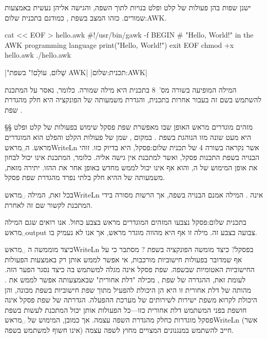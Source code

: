 ישנן שפות בהן פעולות של קלט ופלט בנויות לתוך השפה, והגישה אליהן נעשית באמצעות
 שמורים. כזהו המצב בשפת \AWK, כמודגם ב תכנית שלום:AWK.

\bash
cat << EOF > hello.awk
#!/usr/bin/gawk -f
BEGIN { # "Hello, World!" in the AWK programming language
  print("Hello, World!")
  exit
}
EOF
chmod +x hello.awk
./hello.awk
\END
\begin{תכנית}
\setLTR

\setRTL
{}|"שָׁלוֹם, עוֹלָם!" בשפת AWK|
|תכנית:שלום:AWK|
\end{תכנית}
המילה  המופיעה בשורה מס'~8 בתכנית היא מילה שמורה. כלומר, נאסר על
המתכנת להשתמש בשם זה בעבור  אחרות בתכנית, והגדרת משמעותה של הפונקציה
 היא חלק מהגדרת שפת .

§§ מזהים מוגדרים מראש
האופן שבו מאפשרת שפת פסקל שימוש בפעולות של קלט ופלט היא מעט שונה מזו הנוהגת
בשפת . במקום , שמן של פעולות הקלט והפלט
הוא  המוגדרים מראש. ה ␣מראש{WriteLn} אשר נקראה בשורה 4 של
 תכנית שלום:פסקל, היא בדיוק כזו. זוהי  הבנויה בשפת התכנות פסקל, ואשר
למתכנת אין גישה אליה. כלומר, המתכנת אינו יכול לבחון את אופן המימוש של ה,
והוא אף אינו יכול לממש מחדש באופן אחר את ה הזו. יתירה מזאת, משמעותה של
ה היא חלק בלתי נפרד מהגדרת שפת פסקל.

בכל זאת, המילה ␣מראש{WriteLn} אינה . המילה אמנם 
 הבנויה בשפה, אך הרשות מסורה בידי המתכנת לקשור שם זה ל אחרת.

ב תכנית שלום:פסקל נצבעו המזהים המוגדרים מראש בצבע כחול. אנו רואים שגם המילה
␣מראש{output} צבועה בצבע זה. מילה זו אף היא מהווה  מוגדר מראש, אך
אנו לא נעמיק בו.

כיצד מוממשה ה ␣מראש{WriteLn} בפסקל? כיצד מומשה הפונקציה
 בשפת ? מסתבר כי על אף שמדובר בפעולות חישוביות מורכבות, אי אפשר
    לממש אותן רק באמצעות הפעולות החישוביות האטומיות שבשפה. שפת פסקל אינה מגלה
    למשתמש בה כיצד נסגר הפער הזה. לעומת זאת, ההגדרה של שפת , מכילה "דלת אחורית"
    שבאמצעותה אפשר לממש את . מהותה של דלת אחורית זו היא הן היכולת להפעיל
    מתוך שפת   חישוביות בשפת מכונה, והן היכולת לקרוא משפת  ישירות
    לשירותים של מערכת ההפעלה. הגדרתה של שפת פסקל אינה חושפת בפני
    המשתמש דלת אחורית כזו---כל הפעולות אותן יכול המתכנת לעשות בשפת פסקל
    מוגדרות כחלק מהגדרת השפה עצמה. אך כמובן, המימוש של ␣מראש{WriteLn} (אשר אינו
    חשוף למשתמש בשפה) חייב להשתמש במנגנונים המצויים מחוץ לשפה עצמה.

